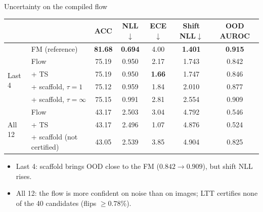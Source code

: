 \documentclass[aspectratio=169,11pt]{beamer}
\begin{document}
\begin{frame}{Uncertainty on the compiled flow}
  \centering
  \small
  \begin{tabular}{@{}llccccc@{}}
    \toprule
    & & ACC & NLL$\downarrow$ & ECE$\downarrow$ & Shift NLL$\downarrow$ & OOD AUROC\\
    \midrule
    & FM (reference) & \textbf{81.68} & \textbf{0.694} & 4.00 & \textbf{1.401} & \textbf{0.915}\\
    \midrule
    \multirow{4}{*}{Last 4} & Flow & 75.19 & 0.950 & 2.17 & 1.743 & 0.842\\
    & + TS & 75.19 & 0.950 & \textbf{1.66} & 1.747 & 0.846\\
    & + scaffold, $\tau=1$ & 75.12 & 0.959 & 1.84 & 2.010 & 0.877\\
    & + scaffold, $\tau=\infty$ & 75.15 & 0.991 & 2.81 & 2.554 & 0.909\\
    \midrule
    \multirow{3}{*}{All 12} & Flow & 43.17 & 2.503 & 3.04 & 4.792 & 0.546\\
    & + TS & 43.17 & 2.496 & 1.07 & 4.876 & 0.524\\
    & + scaffold (not certified) & 43.05 & 2.539 & 3.85 & 4.904 & 0.825\\
    \bottomrule
  \end{tabular}
  \par\medskip\raggedright
  \begin{itemize}
    \item Last 4: scaffold brings OOD close to the FM ($0.842\to0.909$), but shift NLL rises.
    \item All 12: the flow is more confident on noise than on images; LTT certifies none of the 40 candidates (flips $\ge0.78\%$).
  \end{itemize}
\end{frame}
\end{document}
